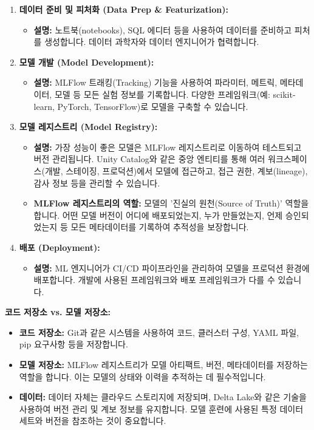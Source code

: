 \documentclass[11pt,a4paper]{article}
\theoremstyle{definition}
\begin{document}
\begin{enumerate}
    \item \textbf{데이터 준비 및 피처화 (Data Prep \& Featurization):}
    \begin{itemize}
        \item \textbf{설명:} 노트북(notebooks), SQL 에디터 등을 사용하여 데이터를 준비하고 피처를 생성합니다. 데이터 과학자와 데이터 엔지니어가 협력합니다.
    \end{itemize}

    \item \textbf{모델 개발 (Model Development):}
    \begin{itemize}
        \item \textbf{설명:} MLFlow 트래킹(Tracking) 기능을 사용하여 파라미터, 메트릭, 메타데이터, 모델 등 모든 실험 정보를 기록합니다. 다양한 프레임워크(예: scikit-learn, PyTorch, TensorFlow)로 모델을 구축할 수 있습니다.
    \end{itemize}

    \item \textbf{모델 레지스트리 (Model Registry):}
    \begin{itemize}
        \item \textbf{설명:} 가장 성능이 좋은 모델은 MLFlow 레지스트리로 이동하여 테스트되고 버전 관리됩니다. Unity Catalog와 같은 중앙 엔티티를 통해 여러 워크스페이스(개발, 스테이징, 프로덕션)에서 모델에 접근하고, 접근 권한, 계보(lineage), 감사 정보 등을 관리할 수 있습니다.
        \item \textbf{MLFlow 레지스트리의 역할:} 모델의 '진실의 원천(Source of Truth)' 역할을 합니다. 어떤 모델 버전이 어디에 배포되었는지, 누가 만들었는지, 언제 승인되었는지 등 모든 메타데이터를 기록하여 추적성을 보장합니다.
    \end{itemize}

    \item \textbf{배포 (Deployment):}
    \begin{itemize}
        \item \textbf{설명:} ML 엔지니어가 CI/CD 파이프라인을 관리하여 모델을 프로덕션 환경에 배포합니다. 개발에 사용된 프레임워크와 배포 프레임워크가 다를 수 있습니다.
    \end{itemize}
\end{enumerate}

\begin{tipbox}
\textbf{코드 저장소 vs. 모델 저장소:}
\begin{itemize}
    \item \textbf{코드 저장소:} Git과 같은 시스템을 사용하여 코드, 클러스터 구성, YAML 파일, pip 요구사항 등을 저장합니다.
    \item \textbf{모델 저장소:} MLFlow 레지스트리가 모델 아티팩트, 버전, 메타데이터를 저장하는 역할을 합니다. 이는 모델의 상태와 이력을 추적하는 데 필수적입니다.
    \item \textbf{데이터:} 데이터 자체는 클라우드 스토리지에 저장되며, Delta Lake와 같은 기술을 사용하여 버전 관리 및 계보 정보를 유지합니다. 모델 훈련에 사용된 특정 데이터 세트와 버전을 참조하는 것이 중요합니다.
\end{itemize}
\end{tipbox}
\end{document}
